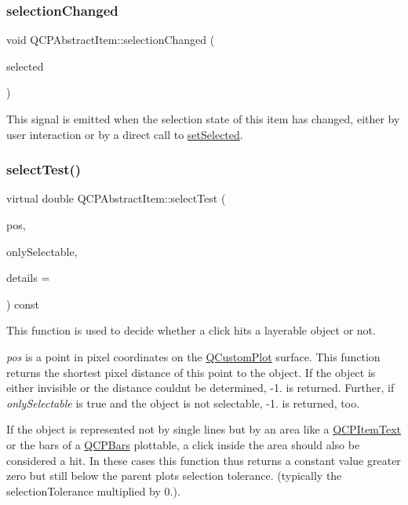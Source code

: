 \subsubsection{\texorpdfstring{selection\+Changed}{selectionChanged}}
{\footnotesize\ttfamily void Q\+C\+P\+Abstract\+Item\+::selection\+Changed (\begin{DoxyParamCaption}\item[{bool}]{selected }\end{DoxyParamCaption})\hspace{0.3cm}{\ttfamily [signal]}}

This signal is emitted when the selection state of this item has changed, either by user interaction or by a direct call to \hyperlink{class_q_c_p_abstract_item_a203de94ad586cc44d16c9565f49d3378}{set\+Selected}. \mbox{\label{class_q_c_p_abstract_item_ae41d0349d68bb802c49104afd100ba2a}} 
\subsubsection{\texorpdfstring{select\+Test()}{selectTest()}}
{\footnotesize\ttfamily virtual double Q\+C\+P\+Abstract\+Item\+::select\+Test (\begin{DoxyParamCaption}\item[{const Q\+PointF \&}]{pos,  }\item[{bool}]{only\+Selectable,  }\item[{Q\+Variant $\ast$}]{details = {} }\end{DoxyParamCaption}) const\hspace{0.3cm}{\ttfamily [pure virtual]}}

This function is used to decide whether a click hits a layerable object or not.

{\itshape pos} is a point in pixel coordinates on the \hyperlink{class_q_custom_plot}{Q\+Custom\+Plot} surface. This function returns the shortest pixel distance of this point to the object. If the object is either invisible or the distance couldn\textquotesingle{}t be determined, -\/1. is returned. Further, if {\itshape only\+Selectable} is true and the object is not selectable, -\/1. is returned, too.

If the object is represented not by single lines but by an area like a \hyperlink{class_q_c_p_item_text}{Q\+C\+P\+Item\+Text} or the bars of a \hyperlink{class_q_c_p_bars}{Q\+C\+P\+Bars} plottable, a click inside the area should also be considered a hit. In these cases this function thus returns a constant value greater zero but still below the parent plot\textquotesingle{}s selection tolerance. (typically the selection\+Tolerance multiplied by 0.).

